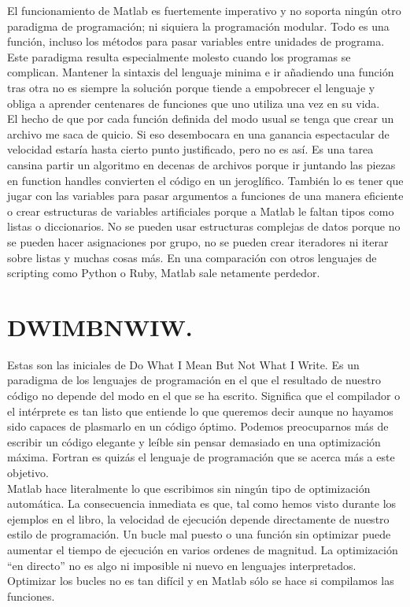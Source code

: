 El funcionamiento de Matlab es fuertemente imperativo y no soporta
ningún otro paradigma de programación; ni siquiera la programación
modular.  Todo es una función, incluso los métodos para pasar
variables entre unidades de programa. Este paradigma resulta
especialmente molesto cuando los programas se complican. Mantener la
sintaxis del lenguaje minima e ir añadiendo una función tras otra no
es siempre la solución porque tiende a empobrecer el lenguaje y obliga
a aprender centenares
de funciones que uno utiliza una vez en su vida.\\

El hecho de que por cada función definida del modo usual se tenga
que crear un archivo me saca de quicio. Si eso desembocara en una
ganancia espectacular de velocidad estaría hasta cierto punto justificado,
pero no es así. Es una tarea cansina partir un algoritmo en decenas
de archivos porque ir juntando las piezas en function handles convierten
el código en un jeroglífico. También lo es tener que jugar con las
variables para pasar argumentos a funciones de una manera eficiente
o crear estructuras de variables artificiales porque a Matlab le faltan
tipos como listas o diccionarios. No se pueden usar estructuras complejas
de datos porque no se pueden hacer asignaciones por grupo, no se pueden
crear iteradores ni iterar sobre listas y muchas cosas más. En una
comparación con otros lenguajes de scripting como Python o Ruby, Matlab
sale netamente perdedor.


\section{DWIMBNWIW.}

Estas son las iniciales de Do What I Mean But Not What I Write. Es
un paradigma de los lenguajes de programación en el que el resultado
de nuestro código no depende del modo en el que se ha escrito. Significa
que el compilador o el intérprete es tan listo que entiende lo que
queremos decir aunque no hayamos sido capaces de plasmarlo en un código
óptimo. Podemos preocuparnos más de escribir un código elegante y
leíble sin pensar demasiado en una optimización máxima. Fortran es
quizás el lenguaje de programación que se acerca más a este objetivo.\\

Matlab hace literalmente lo que escribimos sin ningún tipo de optimización
automática. La consecuencia inmediata es que, tal como hemos visto
durante los ejemplos en el libro, la velocidad de ejecución depende
directamente de nuestro estilo de programación. Un bucle mal puesto
o una función sin optimizar puede aumentar el tiempo de ejecución
en varios ordenes de magnitud. La optimización {}``en directo''
no es algo ni imposible ni nuevo en lenguajes interpretados. Optimizar
los bucles no es tan difícil y en Matlab sólo se hace si compilamos
las funciones.\\

